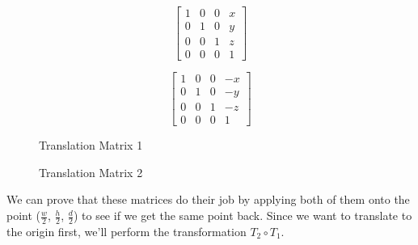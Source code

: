 \documentclass[14pt]{article}
\begin{document}
\begin{figure}[H]
	\vspace*{1em}
	\begin{center}
		\begin{minipage}[b]{0.45\textwidth}
			\centering	
			$$
			\begin{bmatrix}
			1 & 0 & 0 & x \\
			0 & 1 & 0 & y \\ 
			0 & 0 & 1 & z \\
			0 & 0 & 0 & 1
			\end{bmatrix}			
			$$
		\end{minipage}
		\hfill
		\begin{minipage}[b]{0.45\textwidth}
			\centering
			$$
			\begin{bmatrix}
			1 & 0 & 0 & -x \\
			0 & 1 & 0 & -y \\ 
			0 & 0 & 1 & -z \\
			0 & 0 & 0 & 1
			\end{bmatrix}			
			$$
		\end{minipage}
	\end{center}
	\begin{center}
		\begin{minipage}[t]{0.45\textwidth}
			\caption*{Translation Matrix 1}
		\end{minipage}
		\hfill
		\begin{minipage}[t]{0.45\textwidth}
			\caption*{Translation Matrix 2}
		\end{minipage}
	\end{center}
\end{figure}

We can prove that these matrices do their job by applying both of them onto the point ($\frac{w}{2}$, $\frac{h}{2}$, $\frac{d}{2}$) to see if we get the same point back. Since we want to translate to the origin first, we'll perform the transformation $T_2 \circ T_1$.

\vspace*{1em}
\end{document}
